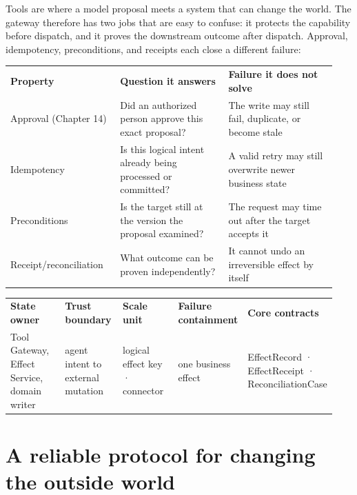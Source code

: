 Tools are where a model proposal meets a system that can change the world. The gateway therefore has two jobs that are easy to confuse: it protects the capability before dispatch, and it proves the downstream outcome after dispatch. Approval, idempotency, preconditions, and receipts each close a different failure:\par

\BookTableStart
\small
\begin{tabular}{@{}Y{0.3133\linewidth}Y{0.3133\linewidth}Y{0.3133\linewidth}@{}}
\color{white}\bfseries \textbf{Property} & \color{white}\bfseries \textbf{Question it answers} & \color{white}\bfseries \textbf{Failure it does not solve} \\
Approval (Chapter 14) & Did an authorized person approve this exact proposal? & The write may still fail, duplicate, or become stale \\
Idempotency & Is this logical intent already being processed or committed? & A valid retry may still overwrite newer business state \\
Preconditions & Is the target still at the version the proposal examined? & The request may time out after the target accepts it \\
Receipt/reconciliation & What outcome can be proven independently? & It cannot undo an irreversible effect by itself \\
\end{tabular}
\BookTableEnd

\BookTableStart
\fontsize{7.2}{9}\selectfont
\begin{tabular}{@{}Y{0.1880\linewidth}Y{0.1880\linewidth}Y{0.1880\linewidth}Y{0.1880\linewidth}Y{0.1880\linewidth}@{}}
\color{white}\bfseries \textbf{State owner} & \color{white}\bfseries \textbf{Trust boundary} & \color{white}\bfseries \textbf{Scale unit} & \color{white}\bfseries \textbf{Failure containment} & \color{white}\bfseries \textbf{Core contracts} \\
Tool Gateway, Effect Service, domain writer & agent intent to external mutation & logical effect key · connector & one business effect & EffectRecord · EffectReceipt · ReconciliationCase \\
\end{tabular}
\BookTableEnd

\section{A reliable protocol for changing the outside world}

